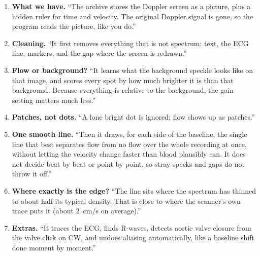 \documentclass[11pt,a4paper]{article}
\begin{document}
\begin{keybox}
\begin{enumerate}[leftmargin=1.3em]
\item \textbf{What we have.} ``The archive stores the Doppler screen as a picture, plus a hidden ruler for time and
velocity. The original Doppler signal is gone, so the program reads the picture, like you do.''
\item \textbf{Cleaning.} ``It first removes everything that is not spectrum: text, the ECG line, markers, and the gap
where the screen is redrawn.''
\item \textbf{Flow or background?} ``It learns what the background speckle looks like on that image, and scores every
spot by how much brighter it is than that background. Because everything is relative to the background, the gain
setting matters much less.''
\item \textbf{Patches, not dots.} ``A lone bright dot is ignored; flow shows up as patches.''
\item \textbf{One smooth line.} ``Then it draws, for each side of the baseline, the single line that best separates
flow from no flow over the whole recording at once, without letting the velocity change faster than blood
plausibly can. It does not decide beat by beat or point by point, so stray specks and gaps do not throw it off.''
\item \textbf{Where exactly is the edge?} ``The line sits where the spectrum has thinned to about half its typical
density. That is close to where the scanner's own trace puts it (about 2~cm/s on average).''
\item \textbf{Extras.} ``It traces the ECG, finds R-waves, detects aortic valve closure from the valve click on CW, and
undoes aliasing automatically, like a baseline shift done moment by moment.''
\end{enumerate}
\end{keybox}
\end{document}
